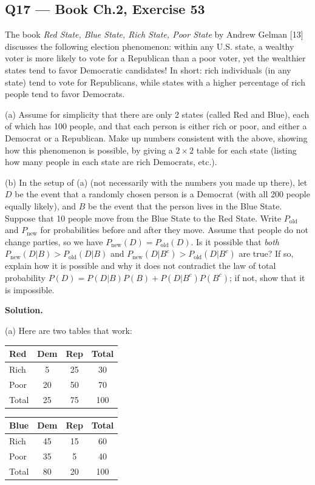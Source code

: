 \documentclass[11pt]{article}
\begin{document}
\subsection*{Q17 --- Book Ch.2, Exercise 53}
\begin{qbox}
The book \textit{Red State, Blue State, Rich State, Poor State} by Andrew Gelman [13] discusses the following election phenomenon: within any U.S. state, a wealthy voter is more likely to vote for a Republican than a poor voter, yet the wealthier states tend to favor Democratic candidates! In short: rich individuals (in any state) tend to vote for Republicans, while states with a higher percentage of rich people tend to favor Democrats.

(a) Assume for simplicity that there are only 2 states (called Red and Blue), each of which has 100 people, and that each person is either rich or poor, and either a Democrat or a Republican. Make up numbers consistent with the above, showing how this phenomenon is possible, by giving a $2\times 2$ table for each state (listing how many people in each state are rich Democrats, etc.).

(b) In the setup of (a) (not necessarily with the numbers you made up there), let $D$ be the event that a randomly chosen person is a Democrat (with all 200 people equally likely), and $B$ be the event that the person lives in the Blue State. Suppose that 10 people move from the Blue State to the Red State. Write $P_{\text{old}}$ and $P_{\text{new}}$ for probabilities before and after they move. Assume that people do not change parties, so we have $P_{\text{new}}(D) = P_{\text{old}}(D)$. Is it possible that \textit{both} $P_{\text{new}}(D|B) > P_{\text{old}}(D|B)$ and $P_{\text{new}}(D|B^c) > P_{\text{old}}(D|B^c)$ are true? If so, explain how it is possible and why it does not contradict the law of total probability $P(D) = P(D|B)P(B) + P(D|B^c)P(B^c)$; if not, show that it is impossible.
\end{qbox}
\textbf{Solution.}

(a) Here are two tables that work:

\medskip
\noindent
\begin{tabular}{l|ccc}
Red & Dem & Rep & Total \\\hline
Rich & 5 & 25 & 30 \\
Poor & 20 & 50 & 70 \\\hline
Total & 25 & 75 & 100
\end{tabular}
\qquad
\begin{tabular}{l|ccc}
Blue & Dem & Rep & Total \\\hline
Rich & 45 & 15 & 60 \\
Poor & 35 & 5 & 40 \\\hline
Total & 80 & 20 & 100
\end{tabular}
\end{document}

